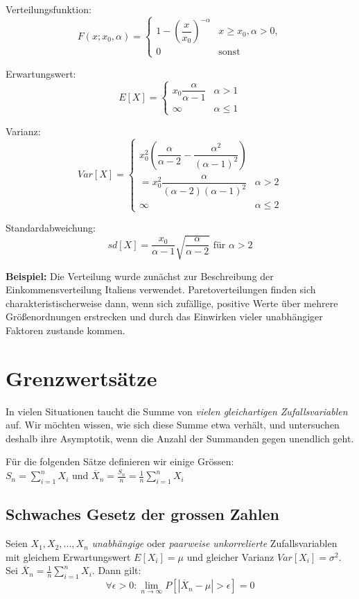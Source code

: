 \documentclass[10pt,a4paper,twocolumn]{article}
\begin{document}
Verteilungsfunktion:
\[
F(x; x_0, \alpha) = \begin{cases}
			1 - \left(\dfrac{x}{x_0}\right)^{-\alpha} & x \geq x_0, \alpha > 0,\\
			0 & \text{sonst}
		\end{cases}
\]

Erwartungswert:
\[
E[X] = \begin{cases}
			x_0\dfrac{\alpha}{\alpha - 1} & \alpha > 1\\
			\infty & \alpha \leq 1
		\end{cases}
\]

Varianz:
\[
Var[X] = \begin{cases}
			x_0^2 \left(\dfrac{\alpha}{\alpha - 2} - \dfrac{\alpha^2}{(\alpha - 1)^2}\right)\\
			= x_0^2 \dfrac{\alpha}{(\alpha - 2)(\alpha - 1)^2} & \alpha > 2\\
			\infty & \alpha \leq 2
		\end{cases}
\]

Standardabweichung:
\[
sd[X]=\dfrac{x_0}{\alpha - 1}\sqrt{\dfrac{\alpha}{\alpha - 2}} \text{ für } \alpha > 2
\]

\textbf{Beispiel:} Die Verteilung wurde zunächst zur Beschreibung der Einkommensverteilung Italiens verwendet. Paretoverteilungen finden sich charakteristischerweise dann, wenn sich zufällige, positive Werte über mehrere Größenordnungen erstrecken und durch das Einwirken vieler unabhängiger Faktoren zustande kommen.

\section{Grenzwertsätze}
In vielen Situationen taucht die Summe von \emph{vielen gleichartigen Zufallsvariablen} auf. Wir möchten wissen, wie sich diese Summe etwa verhält, und untersuchen deshalb ihre Asymptotik, wenn die Anzahl der Summanden gegen unendlich geht.

Für die folgenden Sätze definieren wir einige Grössen:\\
$S_n=\sum\limits_{i=1}^{n}X_i$ und $\overline{X}_n=\frac{S_n}{n}=\frac{1}{n}\sum\limits_{i=1}^{n}X_i$

\subsection{Schwaches Gesetz der grossen Zahlen}
Seien $X_1,X_2,...,X_n$ \emph{unabhängige} oder \emph{paarweise unkorrelierte} Zufallsvariablen mit gleichem Erwartungswert $E[X_i]=\mu$ und gleicher Varianz $Var[X_i]=\sigma^2$. Sei $\overline{X}_n=\frac{1}{n}\sum\nolimits_{i=1}^{n}X_i$. Dann gilt:
\[
\forall\epsilon>0:\lim_{n\to\infty}P\left[|\overline{X}_n-\mu|>\epsilon\right]=0
\]
\end{document}
